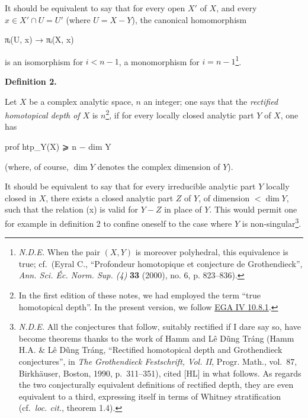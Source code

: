\documentclass[
  11pt,
  a4paper,
]{book}
\newenvironment{Shaded}{}{}
\newcommand{\NormalTok}[1]{#1}
\begin{document}
It should be equivalent to say that for every open \(X'\) of \(X\), and
every \(x \in X' \cap U = U'\) (where \(U = X - Y\)), the canonical
homomorphism

\begin{Shaded}
\begin{Highlighting}[]
\NormalTok{πᵢ(U\textquotesingle{}, x) → πᵢ(X\textquotesingle{}, x)}
\end{Highlighting}
\end{Shaded}

is an isomorphism for \(i < n - 1\), a monomorphism for
\(i = n - 1\)\footnote{\emph{N.D.E.} When the pair \((X, Y)\) is
  moreover polyhedral, this equivalence is true; cf.~(Eyral C.,
  ``Profondeur homotopique et conjecture de Grothendieck'', \emph{Ann.
  Sci. Éc. Norm. Sup. (4)} \textbf{33} (2000), no. 6, p. 823--836).}.

\textbf{Definition 2.}

Let \(X\) be a complex analytic space, \(n\) an integer; one says that
the \emph{rectified homotopical depth of \(X\)} is \(n\)\footnote{In the
  first edition of these notes, we had employed the term ``true
  homotopical depth''. In the present version, we follow
  \href{https://jcreinhold.github.io/ega/iv/23-ch4-10-jacobson-preschemes.html\#108-rectified-depth}{EGA
  IV 10.8.1}.}, if for every locally closed analytic part \(Y\) of
\(X\), one has

\begin{Shaded}
\begin{Highlighting}[]
\NormalTok{prof htp\_Y(X) ⩾ n − dim Y}
\end{Highlighting}
\end{Shaded}

(where, of course, \(\dim Y\) denotes the complex dimension of \(Y\)).

It should be equivalent to say that for every irreducible analytic part
\(Y\) locally closed in \(X\), there exists a closed analytic part \(Z\)
of \(Y\), of dimension \(< \dim Y\), such that the relation (x) is valid
for \(Y - Z\) in place of \(Y\). This would permit one for example in
definition 2 to confine oneself to the case where \(Y\) is
non-singular\footnote{\emph{N.D.E.} All the conjectures that follow,
  suitably rectified if I dare say so, have become theorems thanks to
  the work of Hamm and Lê Dũng Tráng (Hamm H.A. \& Lê Dũng Tráng,
  ``Rectified homotopical depth and Grothendieck conjectures'', in
  \emph{The Grothendieck Festschrift, Vol. II}, Progr. Math., vol.~87,
  Birkhäuser, Boston, 1990, p.~311--351), cited {[}HL{]} in what
  follows. As regards the two conjecturally equivalent definitions of
  rectified depth, they are even equivalent to a third, expressing
  itself in terms of Whitney stratification (cf.~\emph{loc. cit.},
  theorem 1.4).}.
\end{document}
